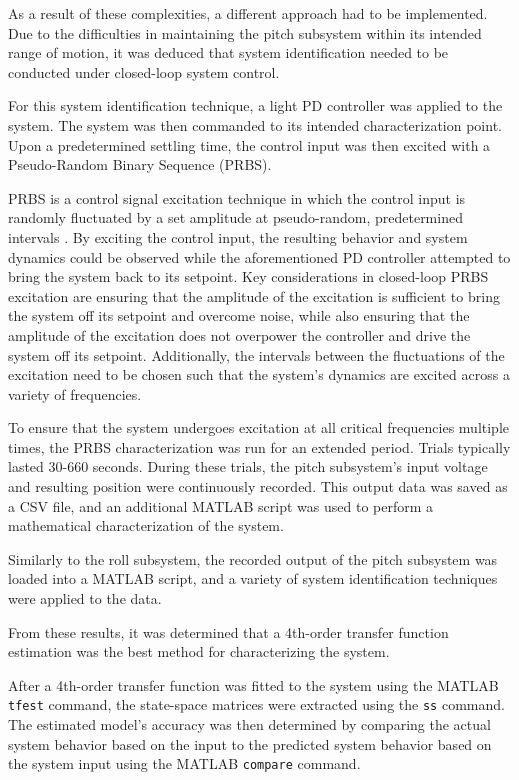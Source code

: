 As a result of these complexities, a different approach had to be implemented. Due to the difficulties in maintaining the pitch subsystem within its intended range of motion, it was deduced that system identification needed to be conducted under closed-loop system control.

For this system identification technique, a light PD controller was applied to the system. The system was then commanded to its intended characterization point. Upon a predetermined settling time, the control input was then excited with a Pseudo-Random Binary Sequence (PRBS).

PRBS is a control signal excitation technique in which the control input is randomly fluctuated by a set amplitude at pseudo-random, predetermined intervals \cite{10.1007/11758532_78}. By exciting the control input, the resulting behavior and system dynamics could be observed while the aforementioned PD controller attempted to bring the system back to its setpoint. Key considerations in closed-loop PRBS excitation are ensuring that the amplitude of the excitation is sufficient to bring the system off its setpoint and overcome noise, while also ensuring that the amplitude of the excitation does not overpower the controller and drive the system off its setpoint. Additionally, the intervals between the fluctuations of the excitation need to be chosen such that the system's dynamics are excited across a variety of frequencies.

To ensure that the system undergoes excitation at all critical frequencies multiple times, the PRBS characterization was run for an extended period. Trials typically lasted 30-660 seconds. During these trials, the pitch subsystem's input voltage and resulting position were continuously recorded. This output data was saved as a CSV file, and an additional MATLAB script was used to perform a mathematical characterization of the system.

Similarly to the roll subsystem, the recorded output of the pitch subsystem was loaded into a MATLAB script, and a variety of system identification techniques were applied to the data.

From these results, it was determined that a 4th-order transfer function estimation was the best method for characterizing the system.

After a 4th-order transfer function was fitted to the system using the MATLAB \texttt{tfest} command, the state-space matrices were extracted using the \texttt{ss} command. The estimated model's accuracy was then determined by comparing the actual system behavior based on the input to the predicted system behavior based on the system input using the MATLAB \texttt{compare} command.

